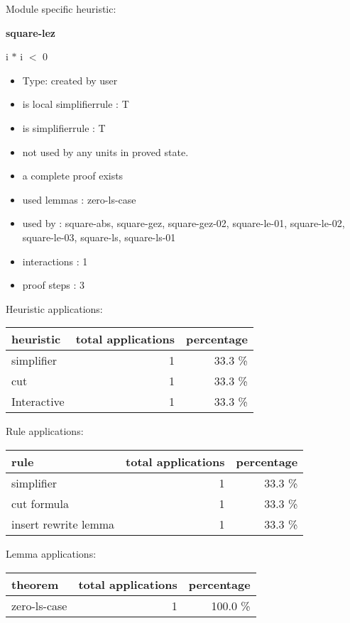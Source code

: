 \documentclass[a4paper]{article}
\begin{document}
Module specific heuristic:

\pagebreak

{\LARGE\bf square-lez}\label{lemma-square-lez}

\medskip

 \Fol \Not i $*$ i $<$ 0

\begin{itemize}

\item Type: created by user

\item is local simplifierrule : T
\item is simplifierrule : T
\item not used by any units in proved state.
\item       a complete proof exists
\item       used lemmas  : zero-ls-case
\item       used by      : square-abs, square-gez, square-gez-02, square-le-01, square-le-02, square-le-03, square-ls, square-ls-01
\item       interactions : 1
\item       proof steps  : 3
\end{itemize}

\medskip


Heuristic applications:

\begin{supertabular}{l|r|r}
heuristic	& total applications & percentage \\ \hline
simplifier & 1 & 33.3 \% \\
cut & 1 & 33.3 \% \\
Interactive & 1 & 33.3 \% \\

\end{supertabular}

Rule applications:

\begin{supertabular}{l|r|r}
rule	        & total applications & percentage \\ \hline
simplifier & 1 & 33.3 \% \\
cut formula & 1 & 33.3 \% \\
insert rewrite lemma & 1 & 33.3 \% \\

\end{supertabular}

Lemma applications:

\begin{supertabular}{l|r|r}
theorem	        & total applications & percentage \\ \hline
zero-ls-case & 1 & 100.0 \% \\

\end{supertabular}
\end{document}
